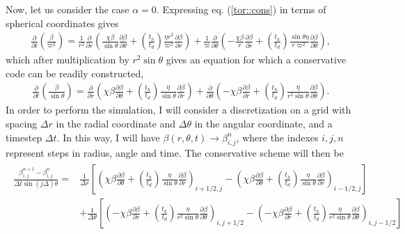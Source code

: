 \documentclass[letterpaper,10pt]{article}
\newcommand{\pp}{\partial}
\newcommand{\D}{\displaystyle}
\begin{document}
Now, let us consider the case $\alpha=0$. Expressing eq. (\ref{tor::cons}) in terms of spherical coordinates gives
\begin{eqnarray}
\frac{\pp}{\pp t}\left(\frac{\beta}{\varpi^2}\right)=\frac{1}{r^2} \frac{\pp}{\pp r}\left(\frac{\chi\beta}{\sin\theta}\frac{\pp \beta}{\pp\theta}+\left(\frac{t_h}{t_d}\right)\frac{\eta r^2}{\varpi^2}\frac{\pp\beta}{\pp r}\right)+\frac{1}{\varpi}\frac{\pp}{\pp\theta}\left(-\frac{\chi\beta}{r}\frac{\pp\beta}{\pp r}+\left(\frac{t_h}{t_d}\right)\frac{\sin\theta \eta}{r\varpi^2}\frac{\pp\beta}{\pp\theta}\right),
\end{eqnarray}
which after multiplication by $r^2\sin\theta$ gives an equation for which a conservative code can be readily constructed,
\begin{eqnarray}
\frac{\pp}{\pp t}\left(\frac{\beta}{\sin\theta}\right)=\frac{\pp}{\pp r}\left(\chi\beta\frac{\pp \beta}{\pp\theta}+\left(\frac{t_h}{t_d}\right)\frac{\eta}{\sin\theta}\frac{\pp\beta}{\pp r}\right)+\frac{\pp}{\pp\theta}\left(-\chi\beta\frac{\pp\beta}{\pp r}+\left(\frac{t_h}{t_d}\right)\frac{\eta}{r^2\sin\theta}\frac{\pp\beta}{\pp\theta}\right).
\end{eqnarray}
In order to perform the simulation, I will consider a discretization on a grid with spacing $\Delta r$ in the radial coordinate and $\Delta \theta$ in the angular coordinate, and a timestep $\Delta t$. In this way, I will have $\beta(r,\theta,t)\rightarrow \beta_{i,j}^n$, where the indexes $i,j,n$ represent steps in radius, angle and time. The conservative scheme will then be
\begin{eqnarray}
\begin{aligned}
\frac{\beta_{i,j}^{n+1}-\beta_{i,j}^{n}}{\Delta t\sin (j\Delta)\theta}=&\D\frac{1}{\Delta r}\left[\left(\chi\beta\frac{\pp \beta}{\pp\theta}+\left(\frac{t_h}{t_d}\right)\frac{\eta}{\sin\theta}\frac{\pp\beta}{\pp r}\right)_{i+1/2,j}-\left(\chi\beta\frac{\pp \beta}{\pp\theta}+\left(\frac{t_h}{t_d}\right)\frac{\eta}{\sin\theta}\frac{\pp\beta}{\pp r}\right)_{i-1/2,j}\right]\\
&\D+\frac{1}{\Delta\theta}\left[\left(-\chi\beta\frac{\pp\beta}{\pp r}+\left(\frac{t_h}{t_d}\right)\frac{\eta}{r^2\sin\theta}\frac{\pp\beta}{\pp\theta}\right)_{i,j+1/2}-\left(-\chi\beta\frac{\pp\beta}{\pp r}+\left(\frac{t_h}{t_d}\right)\frac{\eta}{r^2\sin\theta}\frac{\pp\beta}{\pp\theta}\right)_{i,j-1/2}\right]
\end{aligned}
\end{eqnarray}
\end{document}

